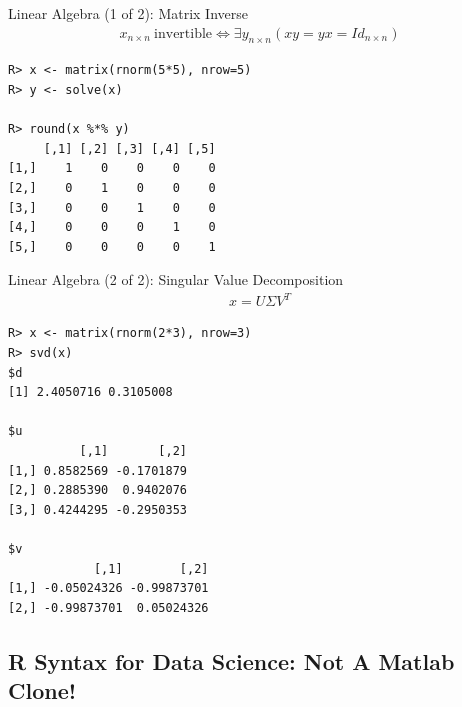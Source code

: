 \begin{frame}[fragile]
  \begin{exampleblock}{Linear Algebra (1 of 2): Matrix Inverse}\pause
  \begin{align*}
    x_{n\times n}\ \text{invertible} \iff \exists y_{n\times n} \left( xy = yx = Id_{n\times n} \right)
  \end{align*}
\begin{lstlisting}[backgroundcolor=\color{white},basicstyle=\ttfamily\color{dkgray}\scriptsize,keywordstyle=\color{black}, 
  commentstyle=\color{orange},stringstyle=\color{mauve}]
R> x <- matrix(rnorm(5*5), nrow=5)
R> y <- solve(x)

R> round(x %*% y)
     [,1] [,2] [,3] [,4] [,5]
[1,]    1    0    0    0    0
[2,]    0    1    0    0    0
[3,]    0    0    1    0    0
[4,]    0    0    0    1    0
[5,]    0    0    0    0    1
\end{lstlisting}
  \end{exampleblock}
\end{frame}



\begin{frame}
  \begin{exampleblock}{Linear Algebra (2 of 2): Singular Value Decomposition}\pause
  \begin{align*}
    x = U\Sigma V^T
  \end{align*}
\begin{lstlisting}[backgroundcolor=\color{white},basicstyle=\ttfamily\color{dkgray}\scriptsize,keywordstyle=\color{black}, 
  commentstyle=\color{orange},stringstyle=\color{mauve}]
R> x <- matrix(rnorm(2*3), nrow=3)
R> svd(x)
$d
[1] 2.4050716 0.3105008

$u
          [,1]       [,2]
[1,] 0.8582569 -0.1701879
[2,] 0.2885390  0.9402076
[3,] 0.4244295 -0.2950353

$v
            [,1]        [,2]
[1,] -0.05024326 -0.99873701
[2,] -0.99873701  0.05024326

\end{lstlisting}
  \end{exampleblock}
\end{frame}





\subsection{R Syntax for Data Science:  Not A Matlab Clone!}

